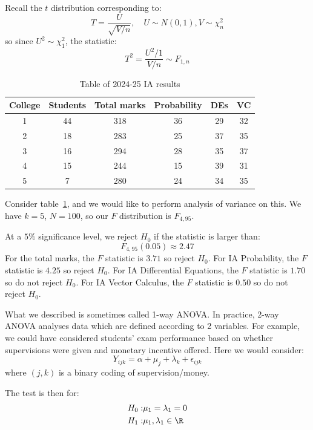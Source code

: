 \documentclass[../Main.tex]{subfiles}
\begin{document}
\begin{remark}
    Recall the $t$ distribution corresponding to:
    \begin{equation*}
        T = \frac{U}{\sqrt{V / n}},\quad U \sim N(0, 1), V\sim\chi_n^2
    \end{equation*}
    so since $U^2 \sim \chi_1^2$, the statistic:
    \begin{equation*}
        T^2 = \frac{U^2 / 1}{V / n} \sim F_{1,n}
    \end{equation*}
\end{remark}
\begin{table}
    \begin{tabular}{|c|c|c|c|c|c|}
        \hline
        College & Students & Total marks & Probability & DEs & VC \\
        \hline
        1 & 44 & 318 & 36 & 29 & 32 \\
        2 & 18 & 283 & 25 & 37 & 35 \\
        3 & 16 & 294 & 28 & 35 & 37 \\
        4 & 15 & 244 & 15 & 39 & 31 \\
        5 &  7 & 280 & 24 & 34 & 35 \\
        \hline
    \end{tabular}
    \caption{Table of 2024-25 IA results}
    \label{tabANOVA}
\end{table}
\begin{example}
    Consider table~\ref{tabANOVA}, and we would like to perform analysis of variance on this. We have $k = 5$, $N = 100$, so our $F$ distribution is $F_{4,95}$.

    At a $5\%$ significance level, we reject $H_0$ if the statistic is larger than:
    \begin{equation*}
        F_{4, 95}(0.05) \approx 2.47
    \end{equation*}
    For the total marks, the $F$ statistic is $3.71$ so reject $H_0$. For IA Probability, the $F$ statistic is $4.25$ so reject $H_0$. For IA Differential Equations, the $F$ statistic is $1.70$ so do not reject $H_0$. For IA Vector Calculus, the $F$ statistic is $0.50$ so do not reject $H_0$.
\end{example}
\begin{remark}
    What we described is sometimes called 1-way ANOVA. In practice, 2-way ANOVA analyses data which are defined according to 2 variables. For example, we could have considered students' exam performance based on whether supervisions were given and monetary incentive offered. Here we would consider:
    \begin{equation*}
        Y_{ijk} = \alpha + \mu_j + \lambda_k + \epsilon_{ijk}
    \end{equation*}
    where $(j, k)$ is a binary coding of supervision/money.

    The test is then for:
    \begin{align*}
        H_0: & \mu_1 = \lambda_1 = 0 \\
        H_1: & \mu_1, \lambda_1 \in \R
    \end{align*}
\end{remark}
\end{document}
